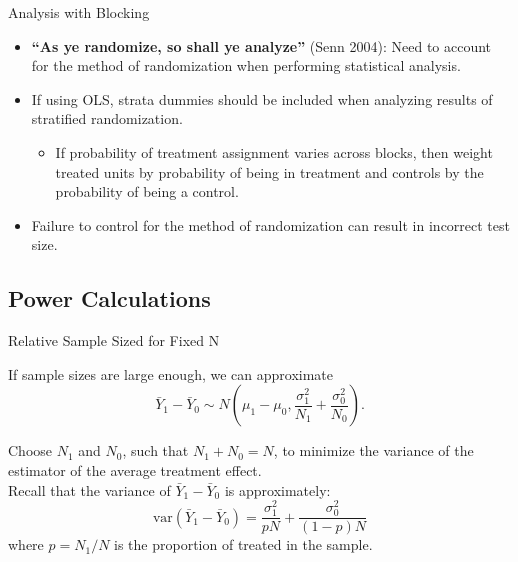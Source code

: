 \documentclass{beamer}
\numberwithin{equation}{section}
\begin{document}
\begin{frame}{Analysis with Blocking}

\begin{itemize}
\itemsep1pt\parskip0pt
\item
  \textbf{``As ye randomize, so shall ye analyze''} (Senn 2004): Need to
  account for the method of randomization when performing statistical
  analysis.
\item
  If using OLS, strata dummies should be included when analyzing results
  of stratified randomization.

  \begin{itemize}
  \itemsep1pt\parskip0pt
  \item
    If probability of treatment assignment varies across blocks, then
    weight treated units by probability of being in treatment and
    controls by the probability of being a control.\\
  \end{itemize}
\item
  Failure to control for the method of randomization can result in
  incorrect test size.
\end{itemize}

\end{frame}

\subsection{Power Calculations}

\begin{frame}{Relative Sample Sized for Fixed N}

If sample sizes are large enough, we can approximate \[
\bar Y_1 - \bar Y_0 \sim N \left(\mu_1-\mu_0,\frac{\sigma^2_1}{N_1}+\frac{\sigma^2_0}{N_0} \right).
\]

\begin{problem}
Choose $N_1$ and $N_0$, such that $N_1+N_0=N$, to
minimize the variance of the estimator of the average treatment effect.\smallskip\\ Recall that the variance
of $\bar Y_1-\bar Y_0$ is approximately:
$$
\mbox{var}(\bar Y_1-\bar Y_0)=
\frac{\sigma^2_1}{p N}+\frac{\sigma^2_0}{(1-p) N}
$$
where $p=N_1/N$ is the proportion of treated in the sample.
\end{problem}

\end{frame}
\end{document}
